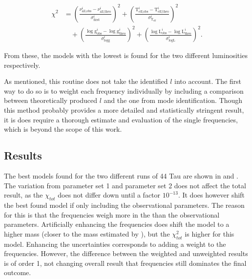 \begin{align}
\chi^2 &= \left(\frac{\nu_{\text{all,obs}}^i-\nu^i_{\text{all,theo}}}{\sigma^i_{\text{first}}}\right)^2
 +
         \left(\frac{\text{T}_\text{eff,obs}^i-\text{T}_\text{eff,theo}^i}{\sigma^i_{\text{T}_\text{eff}}}\right)^2  \nonumber \\
  & \quad +
\left(\frac{\log \text{g}_\text{obs}^i-\log \text{g}_\text{theo}^i}{\sigma^i_{\log \text{g}}}\right)^2  + \left(\frac{\log \text{L}_\text{obs}^i-\log \text{L}_\text{theo}^i}{\sigma^i_{\log \text{L}}}\right)^2.
 \label{eq:chis_all}
\end{align}

From these, the models with the lowest \chis is found for the two different luminosities respectively.

As mentioned, this routine does not take the identified $l$ into account. The first way to do so is to weight each frequency individually by including a comparison between theoretically produced $l$ and the one from mode identification. Though this method probably provides a more detailed and statistically stringent result, it is does require a thorough estimate and evaluation of the single frequencies, which is beyond the scope of this work.


\subsection{Results}
The best models found for the two different runs of 44 Tau are shown in  and . The variation from parameter set 1 and parameter set 2 does not affect the total result, as the $\chi_{tot}$ does not differ down until a factor $10^{-13}$. It does however shift the best found model if only including the observational parameters. The reason for this is that the frequencies weigh more in the \chis than the observational parameters. Artificially enhancing the frequencies does shift the model to a higher mass (closer to the mass estimated by \citet{lenz2010delta}), but the $\chi_{ tot}^2$ is higher for this model. Enhancing the uncertainties corresponds to adding a weight to the frequencies. However, the difference between the weighted and unweighted results is of order 1, not changing overall result that frequencies still dominates the final outcome. 


